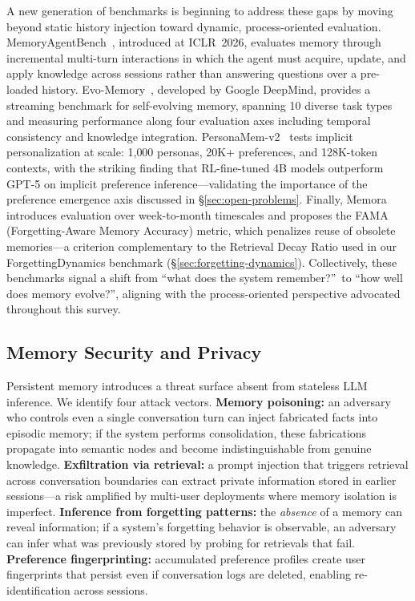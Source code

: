 A new generation of benchmarks is beginning to address these gaps by
moving beyond static history injection toward dynamic, process-oriented
evaluation.  MemoryAgentBench~\cite{memoryagentbench2026}, introduced
at ICLR~2026, evaluates memory through incremental multi-turn
interactions in which the agent must acquire, update, and apply
knowledge across sessions rather than answering questions over a
pre-loaded history.  Evo-Memory~\cite{evomemory2025}, developed by
Google DeepMind, provides a streaming benchmark for self-evolving
memory, spanning 10 diverse task types and measuring performance along
four evaluation axes including temporal consistency and knowledge
integration.  PersonaMem-v2~\cite{personamemv2_2025} tests implicit
personalization at scale: 1{,}000 personas, 20K+ preferences, and
128K-token contexts, with the striking finding that RL-fine-tuned 4B
models outperform GPT-5 on implicit preference inference---validating
the importance of the preference emergence axis discussed in
\S\ref{sec:open-problems}.  Finally,
Memora~\cite{memora2026} introduces evaluation over week-to-month
timescales and proposes the FAMA (Forgetting-Aware Memory Accuracy)
metric, which penalizes reuse of obsolete memories---a criterion
complementary to the Retrieval Decay Ratio used in our
ForgettingDynamics benchmark (\S\ref{sec:forgetting-dynamics}).
Collectively, these benchmarks signal a shift from ``what does the
system remember?''\ to ``how well does memory evolve?'', aligning with
the process-oriented perspective advocated throughout this survey.

\subsection{Memory Security and Privacy}

Persistent memory introduces a threat surface absent from stateless LLM
inference.  We identify four attack vectors.  \textbf{Memory poisoning:}
an adversary who controls even a single conversation turn can inject
fabricated facts into episodic memory; if the system performs
consolidation, these fabrications propagate into semantic nodes and become
indistinguishable from genuine knowledge.  \textbf{Exfiltration via
retrieval:} a prompt injection that triggers retrieval across conversation
boundaries can extract private information stored in earlier sessions---a
risk amplified by multi-user deployments where memory isolation is
imperfect.  \textbf{Inference from forgetting patterns:} the
\emph{absence} of a memory can reveal information; if a system's
forgetting behavior is observable, an adversary can infer what was
previously stored by probing for retrievals that fail.
\textbf{Preference fingerprinting:} accumulated preference profiles
create user fingerprints that persist even if conversation logs are
deleted, enabling re-identification across sessions.

